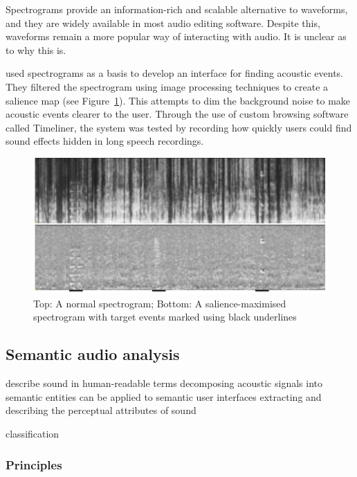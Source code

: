Spectrograms provide an information-rich and scalable alternative to waveforms, and they are widely available in most
audio editing software. Despite this, waveforms remain a more popular way of interacting with audio. It is unclear as
to why this is.

\citet{Goudeseune2012} used spectrograms as a basis to develop an interface for finding acoustic events.  They filtered
the spectrogram using image processing techniques to create a salience map (see Figure~\ref{fig:timeliner}). This
attempts to dim the background noise to make acoustic events clearer to the user.  Through the use of custom browsing
software called Timeliner, the system was tested by recording how quickly users could find sound effects hidden in long
speech recordings.

\begin{figure}[ht]
  \centering
  \includegraphics[width=0.95\linewidth]{figs/spectrogram-salience.png}
  \caption{Top: A normal spectrogram; Bottom: A salience-maximised spectrogram with target events marked using black
    underlines}
  \label{fig:timeliner}
\end{figure}

\subsection{Semantic audio analysis}

describe sound in human-readable terms
decomposing acoustic signals into semantic entities
can be applied to semantic user interfaces
extracting and describing the perceptual attributes of sound

classification


\subsubsection{Principles}

